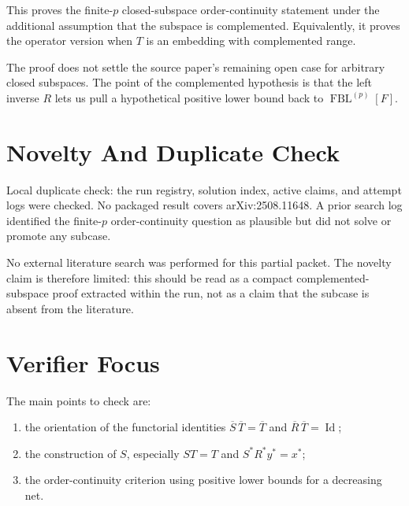 \documentclass[11pt]{article}
\newcommand{\FBL}{\operatorname{FBL}}
\newcommand{\Id}{\operatorname{Id}}
\begin{document}
This proves the finite-\(p\) closed-subspace order-continuity statement under
the additional assumption that the subspace is complemented.  Equivalently,
it proves the operator version when \(T\) is an embedding with complemented
range.

The proof does not settle the source paper's remaining open case for
arbitrary closed subspaces.  The point of the complemented hypothesis is that
the left inverse \(R\) lets us pull a hypothetical positive lower bound back
to \(\FBL^{(p)}[F]\).

\section*{Novelty And Duplicate Check}

Local duplicate check: the run registry, solution index, active claims, and
attempt logs were checked.  No packaged result covers arXiv:2508.11648.  A
prior search log identified the finite-\(p\) order-continuity question as
plausible but did not solve or promote any subcase.

No external literature search was performed for this partial packet.  The
novelty claim is therefore limited: this should be read as a compact
complemented-subspace proof extracted within the run, not as a claim that the
subcase is absent from the literature.

\section*{Verifier Focus}

The main points to check are:
\begin{enumerate}
\item the orientation of the functorial identities
\(\overline S\,\overline T=\overline T\) and
\(\overline R\,\overline T=\Id\);
\item the construction of \(S\), especially \(ST=T\) and
\(S^*R^*y^*=x^*\);
\item the order-continuity criterion using positive lower bounds for a
decreasing net.
\end{enumerate}
\end{document}
